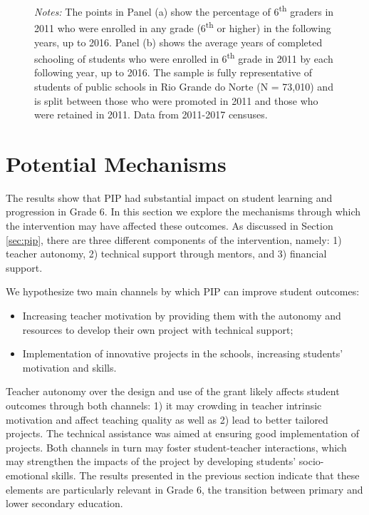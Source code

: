 \documentclass[11pt,a4paper]{article}
\begin{document}
\begin{figure}[ht!]
    \begin{minipage}{0.825\textwidth}
        \small{\textit{Notes:} The points in Panel (a) show the percentage of 6\textsuperscript{th} graders in 2011 who were enrolled in any grade (6\textsuperscript{th} or higher) in the following years, up to 2016. Panel (b) shows the average years of completed schooling of students who were enrolled in 6\textsuperscript{th} grade in 2011 by each following year, up to 2016. The sample is fully representative of students of public schools in Rio Grande do Norte (N = 73,010) and is split between those who were promoted in 2011 and those who were retained in 2011. Data from 2011-2017 censuses.}
    \end{minipage}
\end{figure}

\section{Potential Mechanisms} \label{sec:mechanism}

The results show that PIP had substantial impact on student learning and progression in Grade 6. In this section we explore the mechanisms through which the intervention may have affected these outcomes. As discussed in Section \ref{sec:pip}, there are three different components of the intervention, namely: 1) teacher autonomy, 2) technical support through mentors, and 3) financial support.

We hypothesize two main channels by which PIP can improve student outcomes: 
\begin{itemize}
    \item Increasing teacher motivation by providing them with the autonomy and resources to develop their own project with technical support;
    \item Implementation of innovative projects in the schools, increasing students' motivation and skills.
\end{itemize}

Teacher autonomy over the design and use of the grant likely affects student outcomes through both channels: 1) it may crowding in teacher intrinsic motivation and affect teaching quality as well as 2) lead to better tailored projects. The technical assistance was aimed at ensuring good implementation of projects. Both channels in turn may foster student-teacher interactions, which may strengthen the impacts of the project by developing students' socio-emotional skills. The results presented in the previous section indicate that these elements are particularly relevant in Grade 6, the transition between primary and lower secondary education. 
\end{document}
